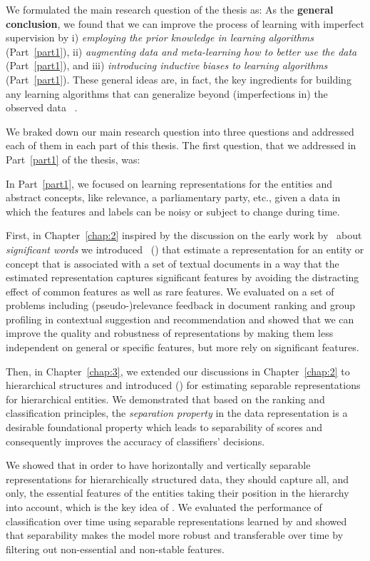 We formulated the main research question of the thesis as:
%
%
As the \textbf{general conclusion}, we found that we can improve the process of learning with imperfect supervision by i) \emph{employing the prior knowledge in learning algorithms} (Part~\ref{part1}), ii) \emph{augmenting data and meta-learning how to better use the data} (Part~\ref{part1}), and iii) \emph{introducing inductive biases to learning algorithms} (Part~\ref{part1}). 
%
These general ideas are, in fact, the key ingredients for building any learning algorithms that can generalize beyond (imperfections in) the observed data ~\citet{Mitchell80theneed}.


We braked down our main research question into three questions and addressed each of them in each part of this thesis.
The first question, that we addressed in Part~\ref{part1} of the thesis, was:
%

In Part~\ref{part1}, we focused on learning representations for the entities and abstract concepts, like relevance, a parliamentary party, etc., given a data in which the features and labels can be noisy or subject to change during time.

First, in Chapter~\ref{chap:2} inspired by the discussion on the early work by~\citet{Luhn:1958} about \emph{significant words} we introduced \emph{\swlms}\ (\acswlm) that estimate a representation for an entity or concept that is associated with a set of textual documents in a way that the estimated representation captures significant features by avoiding the distracting effect of common features as well as rare features. We evaluated \acswlm on a set of problems including (pseudo-)relevance feedback in document ranking and group profiling in contextual suggestion and recommendation and showed that we can improve the quality and robustness of representations by making them less independent on general or specific features, but more rely on significant features.

Then, in Chapter~\ref{chap:3}, we extended our discussions in Chapter~\ref{chap:2} to hierarchical structures and introduced \hswlms (\achswlm) for estimating separable representations for hierarchical entities. We demonstrated that based on the ranking and classification principles, the \emph{separation property} in the data representation is a desirable foundational property which leads to separability of scores and consequently improves the accuracy of classifiers' decisions. 

We showed that in order to have horizontally and vertically separable representations for hierarchically structured data, they should capture all, and only, the essential features of the entities taking their position in the hierarchy into account, which is the key idea of \achswlm. We evaluated the performance of classification over time using separable representations learned by \achswlm and showed that separability makes the model more robust and transferable over time by filtering out non-essential and non-stable features.

